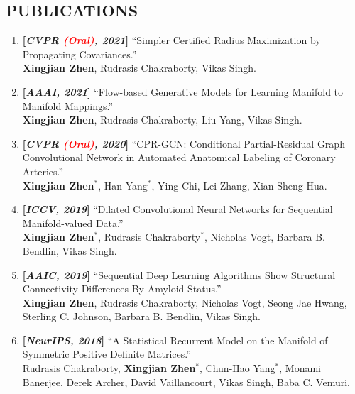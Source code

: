 \documentclass[margin]{res}
\begin{document}
\begin{resume}
\section{PUBLICATIONS}
                \begin{enumerate}[noitemsep,wide=0pt,leftmargin=\dimexpr\labelwidth + 2\labelsep\relax]\itemsep -0.0pt
                \item \textbf{[\emph{CVPR \textcolor{red}{(Oral)}, 2021}]} ``Simpler Certified Radius Maximization by Propagating Covariances.''\\
                            \textbf{Xingjian Zhen}, Rudrasis Chakraborty, Vikas Singh. 
                \item \textbf{[\emph{AAAI, 2021}]} ``Flow-based Generative Models for Learning Manifold to Manifold Mappings.''\\
                            \textbf{Xingjian Zhen}, Rudrasis Chakraborty, Liu Yang, Vikas Singh. 
                \item \textbf{[\emph{CVPR \textcolor{red}{(Oral)}, 2020}]} ``CPR-GCN: Conditional Partial-Residual Graph Convolutional Network in Automated Anatomical Labeling of Coronary Arteries.''\\
                            \textbf{Xingjian Zhen}$^*$, Han Yang$^*$, Ying Chi, Lei Zhang, Xian-Sheng Hua.   
                \item \textbf{[\emph{ICCV, 2019}]} ``Dilated Convolutional Neural Networks for Sequential Manifold-valued Data.'' \\
                             \textbf{Xingjian Zhen}$^*$, Rudrasis Chakraborty$^*$, Nicholas Vogt, Barbara B. Bendlin, Vikas Singh. 
                \item \textbf{[\emph{AAIC, 2019}]} ``Sequential Deep Learning Algorithms Show Structural Connectivity Differences By Amyloid Status.''\\
                             \textbf{Xingjian Zhen}, Rudrasis Chakraborty, Nicholas Vogt, Seong Jae Hwang, Sterling C. Johnson, Barbara B. Bendlin, Vikas Singh. 
                \item \textbf{[\emph{NeurIPS, 2018}]} ``A Statistical Recurrent Model on the Manifold of Symmetric Positive Definite Matrices.''\\
                             Rudrasis Chakraborty, \textbf{Xingjian Zhen}$^*$, Chun-Hao Yang$^*$, Monami Banerjee, Derek Archer, David Vaillancourt, Vikas Singh, Baba C. Vemuri.
                \end{enumerate}


\end{resume}
\end{document}
